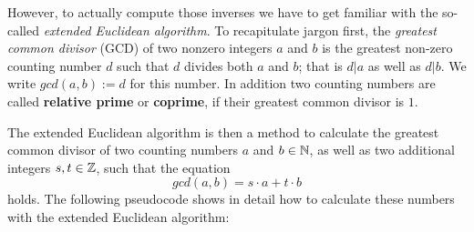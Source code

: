 However, to actually compute those inverses we have to get familiar with the so-called \textit{extended Euclidean algorithm}. To recapitulate jargon first, the \textit{greatest common divisor} (GCD) of two nonzero integers $a$ and $b$ is the greatest non-zero counting number $d$ such that $d$ divides both $a$ and $b$; that is $d|a$ as well as $d|b$. We write $ gcd (a, b):=d $ for this number. In addition two counting numbers are called \textbf{relative prime} or \textbf{coprime}, if their greatest common divisor is $1$.

The extended Euclidean algorithm is then a method to calculate the greatest common divisor of two counting numbers $ a $ and $ b \in \mathbb{N} $, as well as two additional integers $ s, t \in \mathbb{Z} $, such that the equation
\begin{equation}
\label{eq: erw_Eukl_algo}
gcd (a, b) = s \cdot a + t \cdot b
\end{equation}
holds. The following pseudocode shows in detail how to calculate these numbers with the extended Euclidean algorithm:

